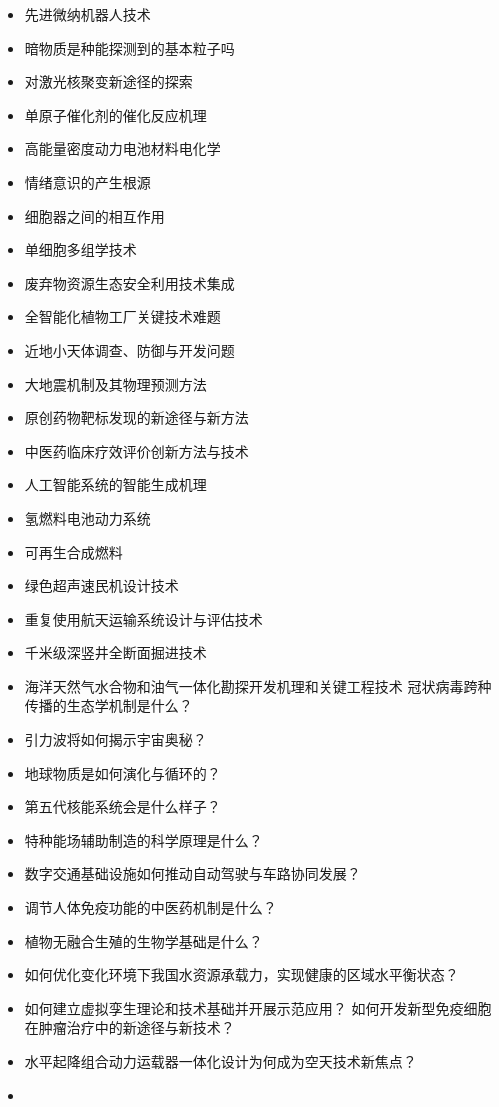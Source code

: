 \documentclass[]{tufte-book}
\begin{document}
\begin{itemize}
\item
  先进微纳机器人技术
\item
  暗物质是种能探测到的基本粒子吗
\item
  对激光核聚变新途径的探索
\item
  单原子催化剂的催化反应机理
\item
  高能量密度动力电池材料电化学
\item
  情绪意识的产生根源
\item
  细胞器之间的相互作用
\item
  单细胞多组学技术
\item
  废弃物资源生态安全利用技术集成
\item
  全智能化植物工厂关键技术难题
\item
  近地小天体调查、防御与开发问题
\item
  大地震机制及其物理预测方法
\item
  原创药物靶标发现的新途径与新方法
\item
  中医药临床疗效评价创新方法与技术
\item
  人工智能系统的智能生成机理
\item
  氢燃料电池动力系统
\item
  可再生合成燃料
\item
  绿色超声速民机设计技术
\item
  重复使用航天运输系统设计与评估技术
\item
  千米级深竖井全断面掘进技术
\item
  海洋天然气水合物和油气一体化勘探开发机理和关键工程技术
  冠状病毒跨种传播的生态学机制是什么？
\item
  引力波将如何揭示宇宙奥秘？
\item
  地球物质是如何演化与循环的？
\item
  第五代核能系统会是什么样子？
\item
  特种能场辅助制造的科学原理是什么？
\item
  数字交通基础设施如何推动自动驾驶与车路协同发展？
\item
  调节人体免疫功能的中医药机制是什么？
\item
  植物无融合生殖的生物学基础是什么？
\item
  如何优化变化环境下我国水资源承载力，实现健康的区域水平衡状态？
\item
  如何建立虚拟孪生理论和技术基础并开展示范应用？
  如何开发新型免疫细胞在肿瘤治疗中的新途径与新技术？
\item
  水平起降组合动力运载器一体化设计为何成为空天技术新焦点？
\item

\end{itemize}
\end{document}
